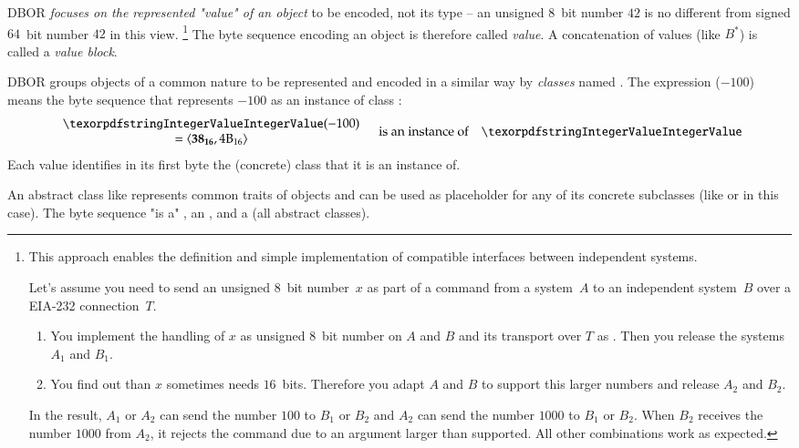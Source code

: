 \medskip
DBOR \emph{focuses on the represented "value" of an object} to be encoded, not its type --
an unsigned $8$~bit number $42$ is no different from signed $64$~bit number $42$ in this view.%
\footnote{%
    This approach enables the definition and simple implementation of compatible interfaces between independent systems.

    Let's assume you need to send an unsigned $8$~bit number~$x$ as part of a command from a system~$A$ to
    an independent system~$B$ over a EIA-232 connection~$T$.
    \begin{enumerate}
        \item
        You implement the handling of $x$ as unsigned $8$~bit number on $A$ and $B$ and its transport over $T$
        as \DborIntegerValue{}.
        Then you release the systems~$A_1$ and $B_1$.

        \item
        You find out than $x$ sometimes needs $16$~bits.
        Therefore you adapt $A$ and $B$ to support this larger numbers and release $A_2$ and $B_2$.
    \end{enumerate}

    In the result, $A_1$ or $A_2$ can send the number $100$ to $B_1$ or $B_2$ and
    $A_2$ can send the number $1000$ to $B_1$ or $B_2$.
    When $B_2$ receives the number $1000$ from $A_2$, it rejects the command due to an argument larger than supported.
    All other combinations work as expected.
}
The byte sequence encoding an object is therefore called \emph{value}.
A concatenation of values (like $B^*$) is called a \emph{value block}.

\medskip
DBOR groups objects of a common nature to be represented and encoded in a similar way by \emph{classes}
named .
The expression \DborIntegerValue($-100$) means the byte sequence that represents $-100$ as an instance of
class \DborIntegerValue{}:
\begin{equation*}
    \begin{array}{c}
        \DborIntegerValue(-100) \\
        = \ByteSequence{\DborFirstByte\DborNumberValueColour{38}, \DborNextByte{4B}}
    \end{array}
    \quad\text{is an instance of}\quad \DborIntegerValue
\end{equation*}
Each value identifies in its first byte the (concrete) class that it is an instance of.

\medskip
An abstract class like \DborNumberValue{} represents common traits of objects and can be used as placeholder for any
of its concrete subclasses (like \DborIntegerValue{} or \DborInfinityValue{} in this case).
The byte sequence  "is a" \DborNumberValue{},
an \DborElementaryValue{}, and a \DborValue{} (all abstract classes).

